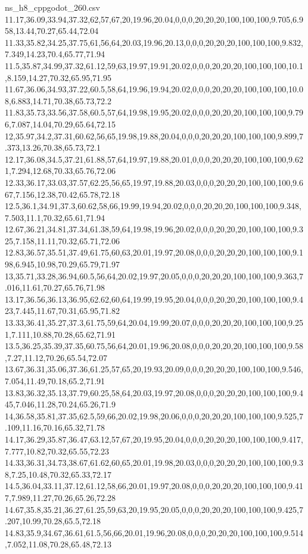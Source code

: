\begin{filecontents*}[overwrite]{ns_h8_cppgodot_260.csv}
11.17,36.09,33.94,37.32,62,57,67,20,19.96,20.04,0,0,0,20,20,20,100,100,100,9.705,6.958,13.44,70.27,65.44,72.04
11.33,35.82,34.25,37.75,61,56,64,20.03,19.96,20.13,0,0,0,20,20,20,100,100,100,9.832,7.349,14.23,70.4,65.77,71.94
11.5,35.87,34.99,37.32,61.12,59,63,19.97,19.91,20.02,0,0,0,20,20,20,100,100,100,10.1,8.159,14.27,70.32,65.95,71.95
11.67,36.06,34.93,37.22,60.5,58,64,19.96,19.94,20.02,0,0,0,20,20,20,100,100,100,10.08,6.883,14.71,70.38,65.73,72.2
11.83,35.73,33.56,37.58,60.5,57,64,19.98,19.95,20.02,0,0,0,20,20,20,100,100,100,9.796,7.087,14.04,70.29,65.64,72.15
12,35.97,34.2,37.31,60.62,56,65,19.98,19.88,20.04,0,0,0,20,20,20,100,100,100,9.899,7.373,13.26,70.38,65.73,72.1
12.17,36.08,34.5,37.21,61.88,57,64,19.97,19.88,20.01,0,0,0,20,20,20,100,100,100,9.621,7.294,12.68,70.33,65.76,72.06
12.33,36.17,33.03,37.57,62.25,56,65,19.97,19.88,20.03,0,0,0,20,20,20,100,100,100,9.667,7.156,12.38,70.42,65.78,72.18
12.5,36.1,34.91,37.3,60.62,58,66,19.99,19.94,20.02,0,0,0,20,20,20,100,100,100,9.348,7.503,11.1,70.32,65.61,71.94
12.67,36.21,34.81,37.34,61.38,59,64,19.98,19.96,20.02,0,0,0,20,20,20,100,100,100,9.325,7.158,11.11,70.32,65.71,72.06
12.83,36.57,35.51,37.49,61.75,60,63,20.01,19.97,20.08,0,0,0,20,20,20,100,100,100,9.198,6.945,10.98,70.29,65.79,71.97
13,35.71,33.28,36.94,60.5,56,64,20.02,19.97,20.05,0,0,0,20,20,20,100,100,100,9.363,7.016,11.61,70.27,65.76,71.98
13.17,36.56,36.13,36.95,62.62,60,64,19.99,19.95,20.04,0,0,0,20,20,20,100,100,100,9.423,7.445,11.67,70.31,65.95,71.82
13.33,36.41,35.27,37.3,61.75,59,64,20.04,19.99,20.07,0,0,0,20,20,20,100,100,100,9.251,7.111,10.88,70.28,65.62,71.91
13.5,36.25,35.39,37.35,60.75,56,64,20.01,19.96,20.08,0,0,0,20,20,20,100,100,100,9.58,7.27,11.12,70.26,65.54,72.07
13.67,36.31,35.06,37.36,61.25,57,65,20,19.93,20.09,0,0,0,20,20,20,100,100,100,9.546,7.054,11.49,70.18,65.2,71.91
13.83,36.32,35.13,37.79,60.25,58,64,20.03,19.97,20.08,0,0,0,20,20,20,100,100,100,9.445,7.046,11.28,70.24,65.26,71.9
14,36.58,35.81,37.35,62.5,59,66,20.02,19.98,20.06,0,0,0,20,20,20,100,100,100,9.525,7.109,11.16,70.16,65.32,71.78
14.17,36.29,35.87,36.47,63.12,57,67,20,19.95,20.04,0,0,0,20,20,20,100,100,100,9.417,7.777,10.82,70.32,65.55,72.23
14.33,36.31,34.73,38.67,61.62,60,65,20.01,19.98,20.03,0,0,0,20,20,20,100,100,100,9.38,7.25,10.48,70.32,65.33,72.17
14.5,36.04,33.11,37.12,61.12,58,66,20.01,19.97,20.08,0,0,0,20,20,20,100,100,100,9.417,7.989,11.27,70.26,65.26,72.28
14.67,35.8,35.21,36.27,61.25,59,63,20,19.95,20.05,0,0,0,20,20,20,100,100,100,9.425,7.207,10.99,70.28,65.5,72.18
14.83,35.9,34.67,36.61,61.5,56,66,20.01,19.96,20.08,0,0,0,20,20,20,100,100,100,9.514,7.052,11.08,70.28,65.48,72.13

\end{filecontents*}
